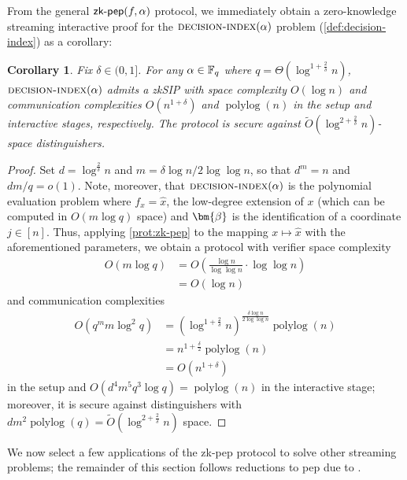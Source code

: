 \documentclass[10pt,a4paper]{article}
\newtheorem{corollary}[theorem]{Corollary}
\theoremstyle{definition}
\newcommand{\zksip}{\textrm{zkSIP}}
\newcommand{\field}{\mathbb{F}}
\newcommand{\polylog}{\operatorname{polylog}}
\newcommand{\decisionindex}{\normalfont\textsc{decision-index}\xspace}
\newcommand{\pepprotocol}{\textsf{pep}\xspace}
\newcommand{\dimension}{m}
\newcommand{\degree}{d}
\newcommand{\fieldsize}{q}
\newcommand{\evaluationpoint}{\bm{\fe2}}
\def\fe#1{
    \ifnum#1=1
        \alpha
    \else
    \ifnum#1=2
        \beta
    \else
    \ifnum#1=3
        \gamma
    \fi\fi\fi
}
\begin{document}
From the general $\textsf{zk-pep}(f,\fe1)$ protocol, we immediately obtain a zero-knowledge streaming interactive proof for the $\decisionindex(\fe1)$ problem (\cref{def:decision-index}) as a corollary:
\begin{corollary}
    \label{cor:index}
    Fix $\delta \in (0,1]$. For any $\fe1 \in \field_\fieldsize$ where $\fieldsize = \Theta\left(\log^{1 + \frac{2}{\delta}} n\right)$, $\decisionindex(\fe1)$ admits a \zksip{} with space complexity $O(\log n)$ and communication complexities $O(n^{1 + \delta})$ and $\polylog(n)$ in the setup and interactive stages, respectively. The protocol is secure against $\tilde O\left(\log^{2 + \frac{2}{\delta}} n\right)$-space distinguishers.
\end{corollary}
\begin{proof}
    Set $\degree = \log^{\frac{2}{\delta}} n$ and $\dimension = \delta \log n / 2\log\log n$, so that $\degree^\dimension = n$ and $\degree\dimension/\fieldsize = o(1)$. Note, moreover, that $\decisionindex(\fe1)$ is the polynomial evaluation problem where $f_x = \hat x$, the low-degree extension of $x$ (which can be computed in $O(\dimension \log \fieldsize)$ space) and $\evaluationpoint$ is the identification of a coordinate $j \in [n]$. Thus, applying \cref{prot:zk-pep} to the mapping $x \mapsto \hat x$ with the aforementioned parameters, we obtain a protocol with verifier space complexity
    \begin{align*}
        O(\dimension \log \fieldsize) &= O\left(\frac{\log n}{\log \log n} \cdot \log \log n\right)\\
        &= O(\log n)
    \end{align*}
    and communication complexities
    \begin{align*}
        O(\fieldsize^\dimension \dimension \log^2 \fieldsize) &= \left(\log^{1 + \frac{2}{\delta}} n\right)^{\frac{\delta \log n}{2\log\log n}} \polylog(n)\\
        &= n^{1 + \frac{\delta}{2}} \polylog(n)\\
        &= O(n^{1 + \delta})
    \end{align*}
    in the setup and $O(\degree^4 \dimension^5 \fieldsize^3 \log \fieldsize) = \polylog(n)$ in the interactive stage; moreover, it is secure against distinguishers with $\degree\dimension^2 \polylog(\fieldsize) = \tilde O\left(\log^{2 + \frac{2}{\delta}} n\right)$ space.
\end{proof}

We now select a few applications of the \textsf{zk-pep} protocol to solve other streaming problems; the remainder of this section follows reductions to \pepprotocol due to \cite{CCMTV19}.
\end{document}
